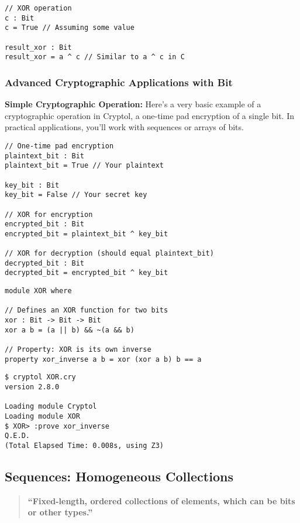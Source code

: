 \begin{lstlisting}[style=cryptol]
// XOR operation
c : Bit
c = True // Assuming some value

result_xor : Bit
result_xor = a ^ c // Similar to a ^ c in C
\end{lstlisting}


\subsubsection{Advanced Cryptographic Applications with Bit}
\textbf{Simple Cryptographic Operation:} Here’s a very basic example of a cryptographic operation in Cryptol, a one-time pad encryption of a single bit. In practical applications, you'll work with sequences or arrays of bits.

\begin{lstlisting}[style=cryptol]
// One-time pad encryption
plaintext_bit : Bit
plaintext_bit = True // Your plaintext

key_bit : Bit
key_bit = False // Your secret key

// XOR for encryption
encrypted_bit : Bit
encrypted_bit = plaintext_bit ^ key_bit

// XOR for decryption (should equal plaintext_bit)
decrypted_bit : Bit
decrypted_bit = encrypted_bit ^ key_bit           
\end{lstlisting}

\newpage
\begin{lstlisting}[style=cryptol]
module XOR where

// Defines an XOR function for two bits
xor : Bit -> Bit -> Bit
xor a b = (a || b) && ~(a && b)

// Property: XOR is its own inverse
property xor_inverse a b = xor (xor a b) b == a
\end{lstlisting}
\begin{lstlisting}[style=zsh]
$ cryptol XOR.cry
version 2.8.0

Loading module Cryptol
Loading module XOR
$ XOR> :prove xor_inverse
Q.E.D.
(Total Elapsed Time: 0.008s, using Z3)
\end{lstlisting}

\newpage
\subsection{Sequences: Homogeneous Collections}
\begin{quote}\bf
``Fixed-length, ordered collections of elements, which can be bits or other types.''
\end{quote}

